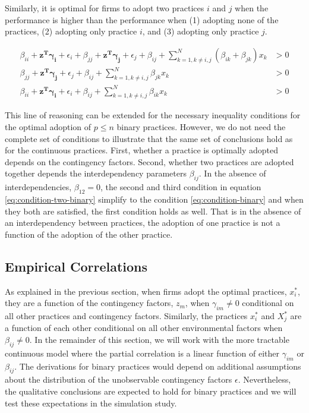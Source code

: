 \documentclass[12pt]{article}
\begin{document}
Similarly, it is optimal for firms to adopt two practices $i$ and $j$ when the performance is higher than the performance when (1) adopting none of the practices, (2) adopting only practice $i$, and (3) adopting only practice $j$. 

\begin{equation} \label{eq:condition-two-binary}
    \begin{aligned}
        \beta_{ii} + \mathbf{z^T} \mathbf{\gamma_i} + \epsilon_i
        + \beta_{jj} + \mathbf{z^T} \mathbf{\gamma_j} + \epsilon_j
        + \beta_{ij} + \sum^{N}_{k = 1, k \neq i,j} (\beta_{ik} + \beta_{jk}) x _k &> 0 \\
        \beta_{jj} + \mathbf{z^T} \mathbf{\gamma_j} + \epsilon_j 
        + \beta_{ij} + \sum^{N}_{k = 1, k \neq i,j} \beta_{jk} x_k &> 0 \\
        \beta_{ii} + \mathbf{z^T} \mathbf{\gamma_i} + \epsilon_i
        + \beta_{ij} + \sum^{N}_{k = 1, k \neq i,j} \beta_{ik} x_k &> 0 
    \end{aligned} 
\end{equation}

This line of reasoning can be extended for the necessary inequality conditions for the optimal adoption of $p \leq n$ binary practices. However, we do not need the complete set of conditions to illustrate that the same set of conclusions hold as for the continuous practices. First, whether a practice is optimally adopted depends on the contingency factors. Second, whether two practices are adopted together depends the interdependency parameters $\beta_{ij}$. In the absence of interdependencies, $\beta_{12} = 0$, the second and third condition in equation \eqref{eq:condition-two-binary} simplify to the condition \eqref{eq:condition-binary} and when they both are satisfied, the first condition holds as well. That is in the absence of an interdependency between practices, the adoption of one practice is not a function of the adoption of the other practice.

\subsection{Empirical Correlations}

As explained in the previous section, when firms adopt the optimal practices, $x^*_i$, they are a function of the contingency factors, $z_m$, when $\gamma_{im} \neq 0$ conditional on all other practices and contingency factors. Similarly, the practices $x^*_i$ and $X^*_j$ are a function of each other conditional on all other environmental factors when $\beta_{ij} \neq 0$. In the remainder of this section, we will work with the more tractable continuous model where the partial correlation is a linear function of either $\gamma_{im}$ or $\beta_{ij}$. The derivations for binary practices would depend on additional assumptions about the distribution of the unobservable contingency factors $\epsilon$. Nevertheless, the qualitative conclusions are expected to hold for binary practices and we will test these expectations in the simulation study.
\end{document}
